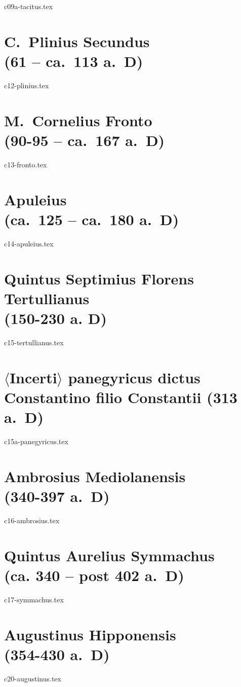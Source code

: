 \documentclass[a4paper,12pt,twoside]{report}
\begin{document}
{c09a-tacitus.tex}

\chapter[Plinius minor]{C.\ Plinius Secundus \\(61 – ca.\ 113 a.~D)}

{c12-plinius.tex}

\chapter[Fronto]{M.\ Cornelius Fronto \\(90-95 – ca.\ 167 a.~D)}

{c13-fronto.tex}

\chapter[Apuleius]{Apuleius \\(ca.\ 125 – ca.\ 180 a.~D)}

{c14-apuleius.tex}

\chapter[Tertullianus]{Quintus Septimius Florens Tertullianus \\(150-230 a. D)}

{c15-tertullianus.tex}

\chapter[Panegyricus Constantino]{$\langle$Incerti$\rangle$ panegyricus dictus Constantino filio Constantii (313 a.~D)}

{c15a-panegyricus.tex}

\chapter[Ambrosius]{Ambrosius Mediolanensis \\(340-397 a.~D)}

{c16-ambrosius.tex}

\chapter[Symmachus]{Quintus Aurelius Symmachus \\(ca. 340 – post 402 a.~D)}

{c17-symmachus.tex}

\chapter[Augustinus]{Augustinus Hipponensis \\(354-430 a.~D)}

{c20-augustinus.tex}



\tableofcontents
\end{document}
